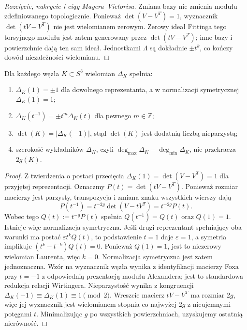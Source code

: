 \begin{proof}[Rozcięcie, nakrycie i ciąg Mayera--Vietorisa]
Zmiana bazy nie zmienia modułu zdefiniowanego topologicznie.
Ponieważ $\det(V-V^T)=1$, wyznacznik $\det(tV-V^T)$
nie jest wielomianem zerowym. Zerowy ideał Fittinga
tego torsyjnego modułu jest zatem generowany przez
$\det(tV-V^T)$; inne bazy i powierzchnie dają ten sam
ideał. Jednostkami $\Lambda$ są dokładnie $\pm t^k$,
co kończy dowód niezależności wielomianu.
\end{proof}

\begin{stwierdzenie}
Dla każdego węzła $K\subset S^3$ wielomian $\Delta_K$ spełnia:
\begin{enumerate}[label=(\roman*)]
\item $\Delta_K(1)=\pm1$ dla dowolnego reprezentanta, a w normalizacji
symetrycznej $\Delta_K(1)=1$;
\item $\Delta_K(t^{-1})=\pm t^m\Delta_K(t)$ dla pewnego $m\in\mathbb Z$;
\item $\det(K)=|\Delta_K(-1)|$, stąd $\det(K)$ jest dodatnią liczbą nieparzystą;
\item szerokość wykładników $\Delta_K$, czyli
$\deg_{\max}\Delta_K-\deg_{\min}\Delta_K$, nie przekracza $2g(K)$.
\end{enumerate}
\end{stwierdzenie}

\begin{proof}
Z twierdzenia o postaci przecięcia
$\Delta_K(1)=\det(V-V^T)=1$ dla przyjętej reprezentacji.
Oznaczmy $P(t)=\det(tV-V^T)$. Ponieważ rozmiar
macierzy jest parzysty, transpozycja i zmiana znaku
wszystkich wierszy dają
\[
P(t^{-1})=t^{-2g}\det(V-tV^T)=t^{-2g}P(t).
\]
Wobec tego $Q(t):=t^{-g}P(t)$ spełnia $Q(t^{-1})=Q(t)$
oraz $Q(1)=1$. Istnieje więc normalizacja symetryczna.
Jeśli drugi reprezentant spełniający oba warunki ma
postać $\varepsilon t^k Q(t)$, to podstawienie $t=1$
daje $\varepsilon=1$, a symetria implikuje
$(t^k-t^{-k})Q(t)=0$. Ponieważ $Q(1)=1$, jest to
niezerowy wielomian Laurenta, więc $k=0$.
Normalizacja symetryczna jest zatem jednoznaczna. Wzór na wyznacznik
węzła wynika z identyfikacji macierzy Foxa przy $t=-1$
z odpowiednią prezentacją modułu Alexandera; jest to standardowa
redukcja relacji Wirtingera. Nieparzystość wynika z kongruencji
$\Delta_K(-1)\equiv\Delta_K(1)\equiv1\pmod2$.
Wreszcie macierz $tV-V^T$ ma rozmiar $2g$, więc jej
wyznacznik jest wielomianem stopnia co najwyżej $2g$
z nieujemnymi potęgami $t$. Minimalizując $g$ po wszystkich
powierzchniach, uzyskujemy ostatnią nierówność.
\end{proof}

